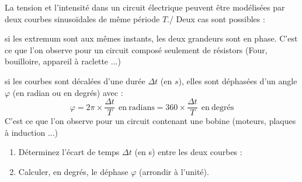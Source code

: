 \documentclass[11pt,a4paper]{article}
\newcommand{\cadreblanc}[1]{%
\medskip\framebox[\linewidth][c]{%
\rule{0mm}{#1mm}}\par
\medskip}
\begin{document}
La tension et l'intensité dans un circuit électrique peuvent être modélisées par deux courbes sinusoïdales de même période $T$./ Deux cas sont possibles : 
\begin{itemize}
   \begin{minipage}{.62\textwidth}%
    \item si les extremum sont aux mêmes instants, les deux grandeurs sont en phase. C'est ce que l'on observe pour un circuit composé seulement de résistors (Four, bouilloire, appareil à raclette ...)
    \end{minipage}%
    \hfill
    \begin{minipage}{.30\textwidth}%
\osci[%
scale=0.48,
second channel=1,
screen offset one=0,
screen offset two=0,
time div=5,
voltage div one=5,
voltage div two=2,
sample rate=200,
xy mode=0,
func one=12*sin(2*180/0.020*x),
func two=3*sin(2*180/0.020*x), 
color one=000000,
color two=808080,
graph back color=FFFFFF,
info back color=D6D6D6,
info text color=000000,
main axis color=000000,
grid color=CCCCCC
]


    \end{minipage}%
    
    
    \item si les courbes sont décalées d'une durée $\Delta t$ (en $s$), elles sont déphasées d'un angle $\varphi$ (en radian ou en degrés) avec : 
    \large{
    $$\varphi = 2\pi\times \dfrac {\Delta  t}{T} \mathrm{~~en~radians} = 360 \times \dfrac {\Delta  t}{T} \mathrm{~~en~degrés}$$}
    \normalsize
    C'est ce que l'on observe pour un circuit contenant une bobine (moteurs, plaques à induction ...) \\[3mm]
    
    \begin{minipage}{.52\textwidth}%
    \begin{enumerate}
        \item Déterminez l'écart de temps $\Delta t $ (en s) entre les deux courbes : \\[2mm]
        \cadreblanc{10}
        \item Calculer, en degrés, le déphase $\varphi$ (arrondir à l'unité). \\[2mm]
        \cadreblanc{18}
        \end{enumerate}

    \end{minipage}%
\hfill
    \begin{minipage}{.4\textwidth}%


\osci[%
scale=0.68,
second channel=1,
screen offset one=0,
screen offset two=0,
time div=5,
voltage div one=5,
voltage div two=2,
sample rate=200,
xy mode=0,
func one=12*sin(2*180/0.020*x),
func two=3*sin(2*180/0.020*x-90), 
color one=000000,
color two=808080,
graph back color=FFFFFF,
info back color=D6D6D6,
info text color=000000,
main axis color=000000,
grid color=CCCCCC
]


    \end{minipage}%
    
    
\end{itemize}
\end{document}
